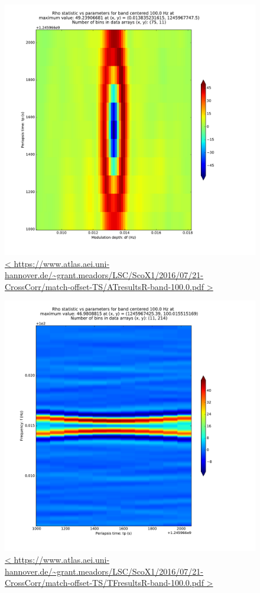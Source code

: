 \documentclass{article}
\begin{document}
\begin{figure}
\includegraphics[trim= 0 0 0 0, clip, width=0.80\paperwidth,keepaspectratio]{plots/match-offset-TS/ATresultsR-band-100-0.pdf}
\caption{
\url{<
https://www.atlas.aei.uni-hannover.de/~grant.meadors/LSC/ScoX1/2016/07/21-CrossCorr/match-offset-TS/ATresultsR-band-100.0.pdf
>}
}
\label{AToffsetGraph}
\end{figure}

\begin{figure}
\includegraphics[trim= 0 0 0 0, clip, width=0.80\paperwidth,keepaspectratio]{plots/match-offset-TS/TFresultsR-band-100-0.pdf}
\caption{
\url{<
https://www.atlas.aei.uni-hannover.de/~grant.meadors/LSC/ScoX1/2016/07/21-CrossCorr/match-offset-TS/TFresultsR-band-100.0.pdf
>}
}
\label{TFoffsetGraph}
\end{figure}
\end{document}
